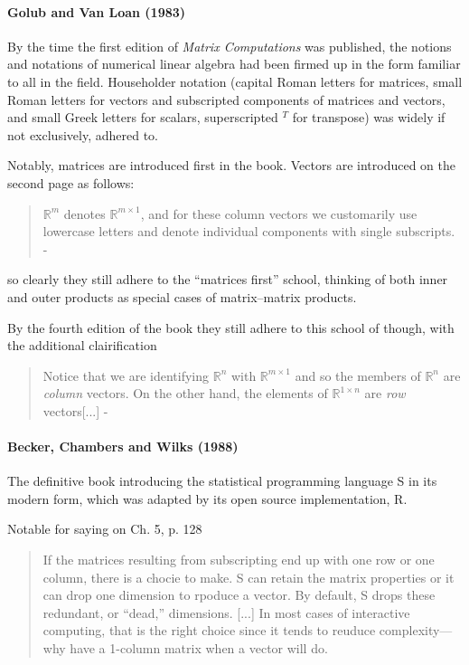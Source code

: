 \paragraph{Golub and Van Loan (1983)~\cite{Golub1983}}

By the time the first edition of \textit{Matrix Computations} was published,
the notions and notations of numerical linear algebra had been firmed up in the
form familiar to all in the field. Householder notation (capital Roman letters
for matrices, small Roman letters for vectors and subscripted components of matrices and vectors,
and small Greek letters for scalars, superscripted $^T$ for transpose) was widely
if not exclusively, adhered to.

Notably, matrices are introduced first in the book.
Vectors are introduced on the second page as follows:
%
\begin{quote}
$\mathbb R^m$ denotes $\mathbb R^{m\times1}$, and for these column vectors we customarily use
lowercase letters and denote individual components with single subscripts.
- \cite[p. 2]{Golub1983}
\end{quote}
%
so clearly they still adhere to the ``matrices first'' school, thinking of both
inner and outer products as special cases of matrix--matrix products.


By the fourth edition of the book they still adhere to this school of though,
with the additional clairification
%
\begin{quote}
Notice that we are identifying $\mathbb R^n$ with $\mathbb R^{m\times1}$ and so the members of $\mathbb R^n$ are
\textit{column} vectors. On the other hand, the elements of $\mathbb R^{1\times n}$ are \textit{row} vectors[...]
- \cite[p. 3]{Golub2013}
\end{quote}
%


\paragraph{Becker, Chambers and Wilks (1988)~\cite{Becker1988}}

The definitive book introducing the statistical programming language S in its
modern form, which was adapted by its open source implementation, R.

Notable for saying on Ch. 5, p. 128

\begin{quote}
If the matrices resulting from subscripting end up with one row or one
column, there is a chocie to make. S can retain the matrix properties or it can
drop one dimension to rpoduce a vector. By default, S drops these redundant,
or ``dead,'' dimensions. [...]
In most cases of interactive computing, that is the right choice since it tends to
reuduce complexity---why have a 1-column matrix when a vector will do.
\end{quote}

